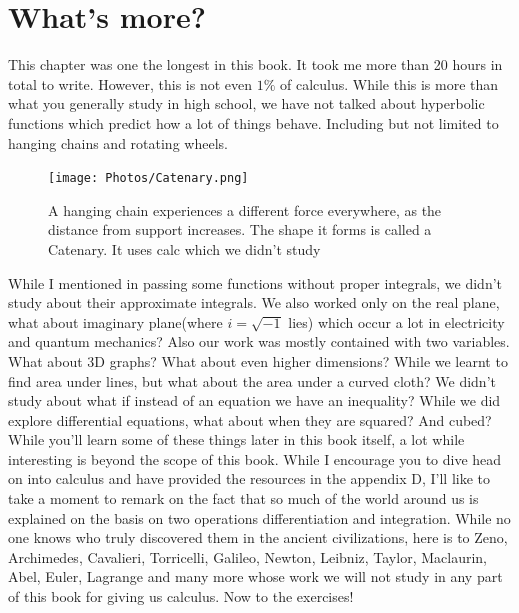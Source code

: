 \section{What's more?}
This chapter was one the longest in this book. It took me more than 20 hours in total to write. However, this is not even $1\%$ of calculus. While this is more than what you generally study in high school, we have not talked about hyperbolic functions which predict how a lot of things behave.  Including but not limited to hanging chains and rotating wheels.
\begin{figure}[ht]
    \centering
    \texttt{[image: Photos/Catenary.png]}
    \caption{A hanging chain experiences a different force everywhere, as the distance from support increases. The shape it forms is called a Catenary. It uses calc which we didn't study}
    
\end{figure}
While I mentioned in passing some functions without proper integrals, we didn't study about their approximate integrals. We also worked only on the real plane, what about imaginary plane(where $i=\sqrt{-1}$ lies) which occur a lot in electricity and quantum mechanics? Also our work was mostly contained with two variables. What about 3D graphs? What about even higher dimensions? While we learnt to find area under lines, but what about the area under a curved cloth? We didn't study about what if instead of an equation we have an inequality? While we did explore differential equations, what about when they are squared? And cubed? While you'll learn some of these things later in this book itself, a lot while interesting is beyond the scope of this book. While I encourage you to dive head on into calculus and have provided the resources in the appendix D, I'll like to take a moment to remark on the fact that so much of the world around us is explained on the basis on two operations differentiation and integration. While no one knows who truly discovered them in the ancient civilizations, here is to Zeno, Archimedes, Cavalieri, Torricelli, Galileo, Newton, Leibniz, Taylor, Maclaurin, Abel, Euler,  Lagrange and many more whose work we will not study in any part of this book for giving us calculus. Now to the exercises!
